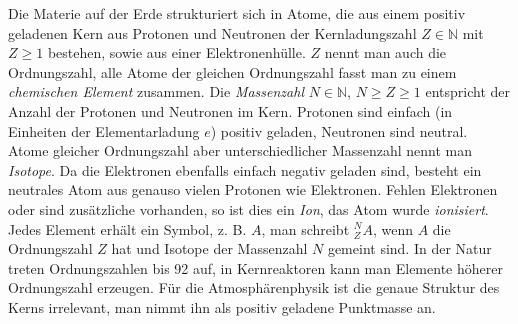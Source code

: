 \documentclass{book}
\begin{document}
Die Materie auf der Erde strukturiert sich in Atome, die aus einem positiv geladenen Kern aus Protonen und Neutronen der Kernladungszahl $Z\in\mathbb{N}$ mit $Z\geq 1$ bestehen, sowie aus einer Elektronenhülle. $Z$ nennt man auch die Ordnungszahl, alle Atome der gleichen Ordnungszahl fasst man zu einem \textit{chemischen Element} zusammen. Die \textit{Massenzahl} $N\in\mathbb{N}$, $N\geq Z\geq 1$ entspricht der Anzahl der Protonen und Neutronen im Kern. Protonen sind einfach (in Einheiten der Elementarladung $e$) positiv geladen, Neutronen sind neutral. Atome gleicher Ordnungszahl aber unterschiedlicher Massenzahl nennt man \textit{Isotope}. Da die Elektronen ebenfalls einfach negativ geladen sind, besteht ein neutrales Atom aus genauso vielen Protonen wie Elektronen. Fehlen Elektronen oder sind zusätzliche vorhanden, so ist dies ein \textit{Ion}, das Atom wurde \textit{ionisiert}. Jedes Element erhält ein Symbol, z. B. $A$, man schreibt $_Z^NA$, wenn $A$ die Ordnungszahl $Z$ hat und Isotope der Massenzahl $N$ gemeint sind. In der Natur treten Ordnungszahlen bis 92 auf, in Kernreaktoren kann man Elemente höherer Ordnungszahl erzeugen. Für die Atmosphärenphysik ist die genaue Struktur des Kerns irrelevant, man nimmt ihn als positiv geladene Punktmasse an.
\end{document}
